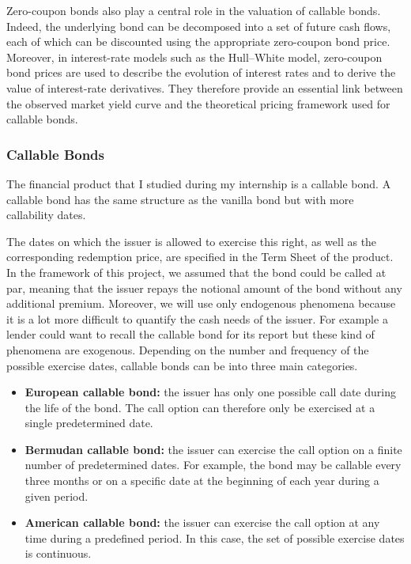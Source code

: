 \documentclass{article}
\begin{document}
Zero-coupon bonds also play a central role in the valuation of callable bonds. Indeed, the underlying bond can be decomposed into a set of future cash flows, each of which can be discounted using the appropriate zero-coupon bond price. Moreover, in interest-rate models such as the Hull--White model, zero-coupon bond prices are used to describe the evolution of interest rates and to derive the value of interest-rate derivatives. They therefore provide an essential link between the observed market yield curve and the theoretical pricing framework used for callable bonds.
\\


\subsubsection{Callable Bonds}

The financial product that I studied during my internship is a callable bond. A callable bond has the same structure as the vanilla bond but with more callability dates.

The dates on which the issuer is allowed to exercise this right, as well as the corresponding redemption price, are specified in the Term Sheet \cite{SGTermSheet} of the product. In the framework of this project, we assumed that the bond could be called at par, meaning that the issuer repays the notional amount of the bond without any additional premium.
Moreover, we will use only endogenous phenomena because it is a lot more difficult to quantify the cash needs of the issuer. For example a lender could want to recall the callable bond for its report but these kind of phenomena are exogenous.
Depending on the number and frequency of the possible exercise dates, callable bonds can be into three main categories.

\begin{itemize}
    \item \textbf{European callable bond:} the issuer has only one possible call date during the life of the bond. The call option can therefore only be exercised at a single predetermined date.

    \item \textbf{Bermudan callable bond:} the issuer can exercise the call option on a finite number of predetermined dates. For example, the bond may be callable every three months or on a specific date at the beginning of each year during a given period.

    \item \textbf{American callable bond:} the issuer can exercise the call option at any time during a predefined period. In this case, the set of possible exercise dates is continuous.
\end{itemize}
\end{document}
